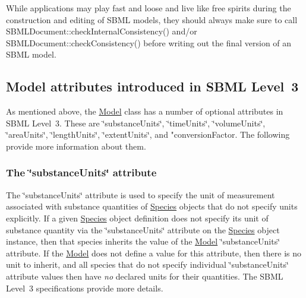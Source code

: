 While applications may play fast and loose and live like free spirits during the construction and editing of S\+B\+ML models, they should always make sure to call S\+B\+M\+L\+Document\+::check\+Internal\+Consistency() and/or S\+B\+M\+L\+Document\+::check\+Consistency() before writing out the final version of an S\+B\+ML model.\hypertarget{class_model_model-l3-attrib}{}\subsection{Model attributes introduced in S\+B\+M\+L Level 3}\label{class_model_model-l3-attrib}
As mentioned above, the \hyperlink{class_model}{Model} class has a number of optional attributes in S\+B\+ML Level~3. These are \char`\"{}substance\+Units\char`\"{}, \char`\"{}time\+Units\char`\"{}, \char`\"{}volume\+Units\char`\"{}, \char`\"{}area\+Units\char`\"{}, \char`\"{}length\+Units\char`\"{}, \char`\"{}extent\+Units\char`\"{}, and "conversion\+Factor. The following provide more information about them.\hypertarget{class_model_model-l3-substanceunits}{}\subsubsection{The \char`\"{}substance\+Units\char`\"{} attribute}\label{class_model_model-l3-substanceunits}
The \char`\"{}substance\+Units\char`\"{} attribute is used to specify the unit of measurement associated with substance quantities of \hyperlink{class_species}{Species} objects that do not specify units explicitly. If a given \hyperlink{class_species}{Species} object definition does not specify its unit of substance quantity via the \char`\"{}substance\+Units\char`\"{} attribute on the \hyperlink{class_species}{Species} object instance, then that species inherits the value of the \hyperlink{class_model}{Model} \char`\"{}substance\+Units\char`\"{} attribute. If the \hyperlink{class_model}{Model} does not define a value for this attribute, then there is no unit to inherit, and all species that do not specify individual \char`\"{}substance\+Units\char`\"{} attribute values then have {\itshape no} declared units for their quantities. The S\+B\+ML Level~3 specifications provide more details.

